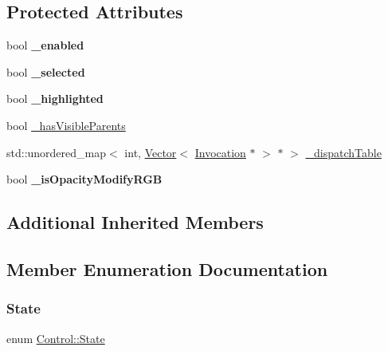 \subsection*{Protected Attributes}
\begin{DoxyCompactItemize}
\item 
\mbox{\label{classControl_a49248afb39cb0f77fb36080d8f84a7f7}} 
bool {\bfseries \+\_\+enabled}
\item 
\mbox{\label{classControl_a82f1272cb7e7864a063af5967ed541fe}} 
bool {\bfseries \+\_\+selected}
\item 
\mbox{\label{classControl_a51a9353eb4275efc1f5b8a441fc671fc}} 
bool {\bfseries \+\_\+highlighted}
\item 
bool \hyperlink{classControl_a220d7ad63279b15d0eed92eec97d8020}{\+\_\+has\+Visible\+Parents}
\item 
std\+::unordered\+\_\+map$<$ int, \hyperlink{classVector}{Vector}$<$ \hyperlink{classInvocation}{Invocation} $\ast$ $>$ $\ast$ $>$ \hyperlink{classControl_ae60bdd523e1a0ffd80cc2be6d73adc74}{\+\_\+dispatch\+Table}
\item 
\mbox{\label{classControl_a3692a2c55bccc7b67b4a1e90d61719bb}} 
bool {\bfseries \+\_\+is\+Opacity\+Modify\+R\+GB}
\end{DoxyCompactItemize}
\subsection*{Additional Inherited Members}


\subsection{Member Enumeration Documentation}
\mbox{\label{classControl_a89e9598cd785841ac91cff3c4798c469}} 
\subsubsection{\texorpdfstring{State}{State}\hspace{0.1cm}{\footnotesize\ttfamily [1/2]}}
{\footnotesize\ttfamily enum \hyperlink{classControl_a89e9598cd785841ac91cff3c4798c469}{Control\+::\+State}\hspace{0.3cm}{\ttfamily [strong]}}

